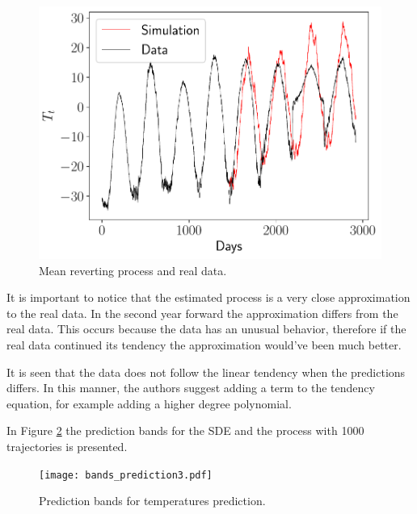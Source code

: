 \documentclass[11pt]{article}
\theoremstyle{definition}
\theoremstyle{remark}
\theoremstyle{remark}
\begin{document}
\begin{figure}
  \centering
  \includegraphics[scale=.5]{pred_estimated_temps.pdf}
  \caption{Mean reverting process and real data.}
  \label{fig:pred3}
\end{figure}

It is important to notice that the estimated process is a very close
approximation to the real data. In the second year forward the
approximation differs from the real data. This occurs because the data
has an unusual behavior, therefore if the real data continued its
tendency the approximation would've been much better.

It is seen that the data does not follow the linear tendency when the
predictions differs. In this manner, the authors suggest adding a term
to the tendency equation, for example adding a higher degree
polynomial.

In Figure \ref{fig:bands3} the prediction bands for the SDE and the
process with 1000 trajectories is presented.

\begin{figure}
  \centering
  \texttt{[image: bands\_prediction3.pdf]}
  \caption{Prediction bands for temperatures prediction.}
  \label{fig:bands3}
\end{figure}

\FloatBarrier
\printbibliography
\end{document}
